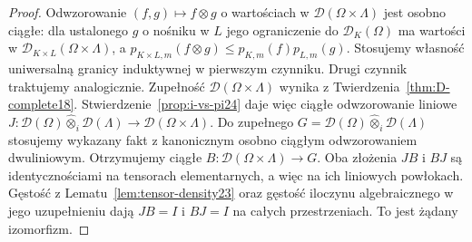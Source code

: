 \begin{proof}
Odwzorowanie $(f,g)\mapsto f\otimes g$ o wartościach
w $\mathcal D(\Omega\times\Lambda)$ jest osobno ciągłe:
dla ustalonego $g$ o nośniku w $L$ jego ograniczenie
do $\mathcal D_K(\Omega)$ ma wartości w
$\mathcal D_{K\times L}(\Omega\times\Lambda)$, a
$p_{K\times L,m}(f\otimes g)\le p_{K,m}(f)p_{L,m}(g)$.
Stosujemy własność uniwersalną granicy induktywnej
w pierwszym czynniku. Drugi czynnik traktujemy analogicznie.
Zupełność $\mathcal D(\Omega\times\Lambda)$ wynika z
Twierdzenia~\ref{thm:D-complete18}.
Stwierdzenie~\ref{prop:i-vs-pi24} daje więc ciągłe
odwzorowanie liniowe
$J:\mathcal D(\Omega)\widehat\otimes_i\mathcal D(\Lambda)
\to\mathcal D(\Omega\times\Lambda)$.
Do zupełnego $G=\mathcal D(\Omega)\widehat\otimes_i
\mathcal D(\Lambda)$ stosujemy wykazany fakt z
kanonicznym osobno ciągłym odwzorowaniem dwuliniowym.
Otrzymujemy ciągłe $B:\mathcal D(\Omega\times\Lambda)\to G$.
Oba złożenia $JB$ i $BJ$ są identycznościami
na tensorach elementarnych, a więc na ich liniowych
powłokach. Gęstość z Lematu~\ref{lem:tensor-density23}
oraz gęstość iloczynu algebraicznego w jego uzupełnieniu
dają $JB=I$ i $BJ=I$ na całych przestrzeniach.
To jest żądany izomorfizm.
\end{proof}

